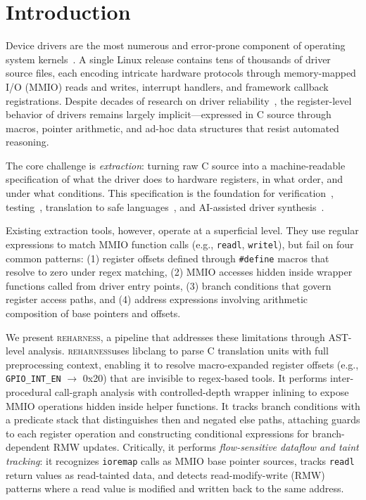 \documentclass[sigconf,review]{acmart}
\newcommand{\reharness}{\textsc{reharness}}
\begin{document}
\section{Introduction}

Device drivers are the most numerous and error-prone component of operating system kernels~\cite{chou2001empirical,swift2003improving}. A single Linux release contains tens of thousands of driver source files, each encoding intricate hardware protocols through memory-mapped I/O (MMIO) reads and writes, interrupt handlers, and framework callback registrations. Despite decades of research on driver reliability~\cite{ball2006thorough,ryzhyk2009dingo,kadav2009tolerating}, the register-level behavior of drivers remains largely implicit---expressed in C source through macros, pointer arithmetic, and ad-hoc data structures that resist automated reasoning.

The core challenge is \emph{extraction}: turning raw C source into a machine-readable specification of what the driver does to hardware registers, in what order, and under what conditions. This specification is the foundation for verification~\cite{witkowski2007automated}, testing~\cite{cadar2008klee}, translation to safe languages~\cite{emrath2021c2rust}, and AI-assisted driver synthesis~\cite{roelofs2023large}.

Existing extraction tools, however, operate at a superficial level. They use regular expressions to match MMIO function calls (e.g., \texttt{readl}, \texttt{writel}), but fail on four common patterns: (1) register offsets defined through \texttt{\#define} macros that resolve to zero under regex matching, (2) MMIO accesses hidden inside wrapper functions called from driver entry points, (3) branch conditions that govern register access paths, and (4) address expressions involving arithmetic composition of base pointers and offsets.

We present \reharness, a pipeline that addresses these limitations through AST-level analysis. \reharness uses libclang to parse C translation units with full preprocessing context, enabling it to resolve macro-expanded register offsets (e.g., \texttt{GPIO\_INT\_EN} $\rightarrow$ 0x20) that are invisible to regex-based tools. It performs inter-procedural call-graph analysis with controlled-depth wrapper inlining to expose MMIO operations hidden inside helper functions. It tracks branch conditions with a predicate stack that distinguishes then and negated else paths, attaching guards to each register operation and constructing conditional expressions for branch-dependent RMW updates. Critically, it performs \emph{flow-sensitive dataflow and taint tracking}: it recognizes \texttt{ioremap} calls as MMIO base pointer sources, tracks \texttt{readl} return values as read-tainted data, and detects read-modify-write (RMW) patterns where a read value is modified and written back to the same address.
\end{document}
